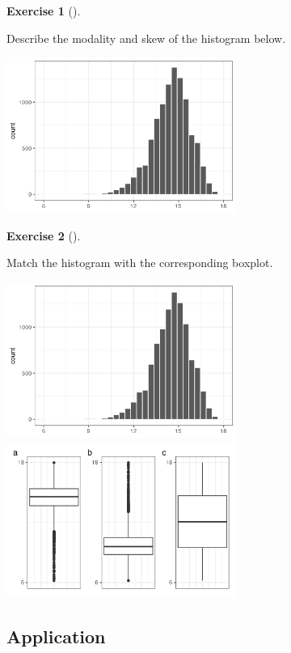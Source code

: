 \documentclass[
  letterpaper,
  DIV=11,
  numbers=noendperiod]{scrreprt}
\theoremstyle{definition}
\newtheorem{exercise}{Exercise}[chapter]
\theoremstyle{remark}
\begin{document}
\begin{exercise}[]\protect\hypertarget{exr-ch02-c11}{}\label{exr-ch02-c11}

Describe the modality and skew of the histogram below.

\includegraphics[width=\textwidth,height=2in]{images/exercises/ch02_match_hist.png}

\end{exercise}

\begin{exercise}[]\protect\hypertarget{exr-ch02-c12}{}\label{exr-ch02-c12}

Match the histogram with the corresponding boxplot.

\includegraphics[width=\textwidth,height=2in]{images/exercises/ch02_match_hist.png}
\includegraphics[width=\textwidth,height=2in]{images/exercises/ch02_match_box.png}

\end{exercise}

\hypertarget{sec-ex02-application}{%
\subsection{Application}\label{sec-ex02-application}}
\end{document}
